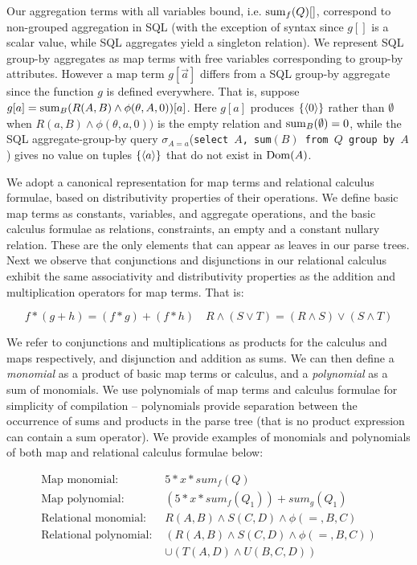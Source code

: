 Our aggregation terms with all variables bound, i.e. $\mathrm{sum}_{f}(Q)[]$,
correspond to non-grouped aggregation in SQL (with the exception of syntax since
$g[]$ is a scalar value, while SQL aggregates yield a singleton relation).  We
represent SQL group-by aggregates as map terms with free variables corresponding
to group-by attributes. However a map term $g[\vec{a}]$
differs from a SQL group-by aggregate since the function $g$ is defined everywhere.
That is, suppose $g[a] = \mathrm{sum}_{B}(R(A,B) \wedge \phi(\theta,A,0))[a]$. Here $g[a]$
produces $\{{\langle0\rangle}\}$ rather than $\emptyset$ when
$R(a,B) \wedge \phi(\theta,a,0))$ is the empty relation and
$\mathrm{sum}_{B}(\emptyset) = 0$, while the SQL aggregate-group-by query
$\sigma_{A=a}$(\texttt{select $A$, sum$(B)$ from $Q$ group by $A$})
gives no value on tuples $\{{\langle a\rangle}\}$ that do not exist in $\mathrm{Dom}(A)$.


We adopt a canonical representation for map terms and relational calculus
formulae, based on distributivity properties of their operations. We define
basic map terms as constants, variables, and aggregate operations, and the basic
calculus formulae as relations, constraints, an empty and a constant
nullary relation. These are the only elements that can appear as leaves in our
parse trees. Next we observe that conjunctions and disjunctions in our relational
calculus exhibit the same associativity and distributivity properties as the
addition and multiplication operators for map terms. That is:

\[
f*(g+h) = (f*g) + (f*h)
\quad
R \wedge(S \vee T) = (R \wedge S) \vee (S \wedge T)
\]


We refer to conjunctions and multiplications as products for the calculus and
maps respectively, and disjunction and addition as sums.  We can then define a
\textit{monomial} as a product of basic map terms or calculus, and a
\textit{polynomial} as a sum of monomials. We use polynomials of map terms and
calculus formulae for simplicity of compilation -- polynomials provide
separation between the occurrence of sums and products in the parse tree (that
is no product expression can contain a sum operator).  We provide examples of
monomials and polynomials of both map and relational calculus formulae below:

\begin{align*}
\mbox{Map monomial: } &
5*x*sum_{f}(Q)\\
\mbox{Map polynomial: } &
(5*x*sum_{f}(Q_1)) + sum_g(Q_1)\\
\mbox{Relational monomial: } &
R(A,B) \wedge S(C,D) \wedge \phi(=,B,C)\\
\mbox{Relational polynomial: } &
(R(A,B) \wedge S(C,D) \wedge \phi(=,B,C)) \\
& \cup (T(A,D) \wedge U(B,C,D))
\end{align*}


